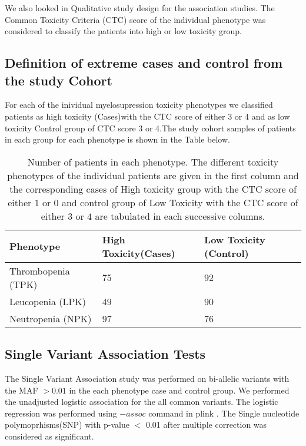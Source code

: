We also looked in Qualitative study design for the association studies. The Common Toxicity Criteria (CTC) score of the individual phenotype was considered to classify the patients into high or low toxicity group.

\subsection{Definition of extreme cases and control from the study Cohort}

For each of the inividual myelosupression toxicity phenotypes we classified patients  as high toxicity (Cases)with the CTC score of either 3 or 4 and as low toxicity Control group of CTC score 3 or 4.The study cohort samples of patients in each group for each phenotype is shown in the Table below.

\begin{table}[h]
	\begin{tabular}{lll}
		\hline
		\multicolumn{1}{|l|}{\textbf{Phenotype}} & \multicolumn{1}{l|}{\textbf{High Toxicity(Cases)}} & \multicolumn{1}{l|}{\textbf{Low Toxicity (Control)}} \\ \hline
		\multicolumn{1}{|l|}{Thrombopenia (TPK)} & \multicolumn{1}{l|}{75} & \multicolumn{1}{l|}{92} \\ \hline
		\multicolumn{1}{|l|}{Leucopenia (LPK)} & \multicolumn{1}{l|}{49} & \multicolumn{1}{l|}{90} \\ \hline
		\multicolumn{1}{|l|}{Neutropenia (NPK)} & \multicolumn{1}{l|}{97} & \multicolumn{1}{l|}{76} \\ \hline
\end{tabular}
\caption{Number of patients in each phenotype. The different toxicity phenotypes of the individual patients are given in the first column and the corresponding cases of High toxicity group with the CTC score of either $1$ or $0$ and control group of Low Toxicity with the CTC score of either $3$ or $4$ are tabulated in each successive columns.}
\label{phenotype classification}
\end{table}


\subsection{Single Variant Association Tests}

The Single Variant Association study was performed on bi-allelic variants with the MAF $> 0.01$ in the each phenotype case and control group. We performed the unadjusted logistic association for the all common variants. The logistic regression was performed using $-assoc$ command in plink \cite{purcell2007plink}. The Single nucleotide polymoprhisms(SNP) with p-value $<$ 0.01 after multiple correction was considered as significant. 

